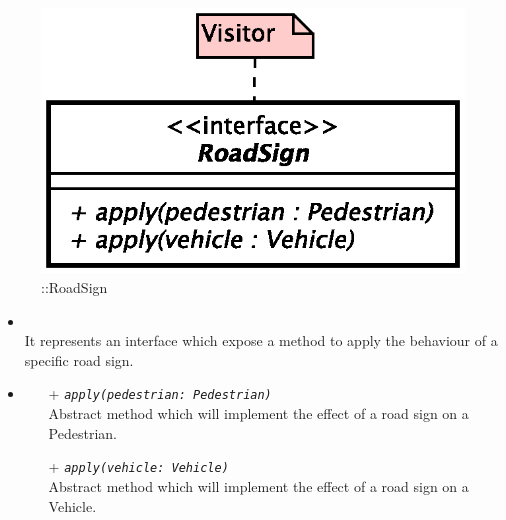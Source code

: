 \begin{figure}[h]
\centering
\includegraphics[scale=0.6,keepaspectratio]{images/solution/app/backend/road_sign.eps}
\caption{\pPassive::RoadSign}
\label{fig:sd-app-road-sign}
\end{figure}
\FloatBarrier
\begin{itemize}
  \item \textbf{\descr} \\
    It represents an interface which expose a method to apply the behaviour of a specific road sign.
  \item \textbf{\ops}
  \begin{itemize} 
    \item[+] \texttt{\textit{apply(pedestrian: Pedestrian)}} \\
Abstract method which will implement the effect of a road sign on a Pedestrian.
    \item[+] \texttt{\textit{apply(vehicle: Vehicle)}} \\
Abstract method which will implement the effect of a road sign on a Vehicle.
  \end{itemize}
\end{itemize}
